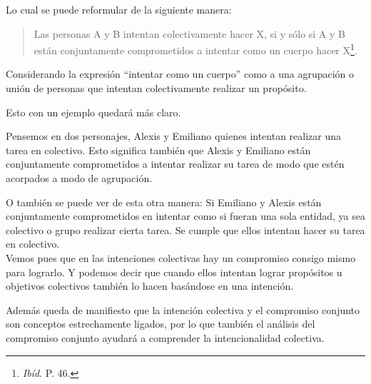 \documentclass[oneside]{book}
\begin{document}
Lo cual se puede reformular de la siguiente manera:

\begin{quote}
Las personas A y B intentan colectivamente hacer X, si y sólo si A y B están conjuntamente comprometidos a intentar como un cuerpo hacer X\footnote{\textit{Ibíd}. P. 46.}.
\end{quote}

Considerando la expresión “intentar como un cuerpo” como a una agrupación o unión de personas que intentan colectivamente realizar un propósito.

Esto con un ejemplo quedará más claro.

Pensemos en dos personajes, Alexis y Emiliano quienes intentan realizar una tarea en colectivo. Esto significa también que Alexis y Emiliano están conjuntamente comprometidos a intentar realizar su tarea de modo que estén acorpados a modo de agrupación.

O también se puede ver de esta otra manera: Si Emiliano y Alexis están conjuntamente comprometidos en intentar como si fueran una sola entidad, ya sea colectivo o grupo realizar cierta tarea. Se cumple que ellos intentan hacer su tarea en colectivo.
\\

Vemos pues que en las intenciones colectivas hay un compromiso consigo mismo para lograrlo. Y podemos decir que cuando ellos intentan lograr propósitos u objetivos colectivos también lo hacen basándose en una intención. 



Además queda de manifiesto que la intención colectiva y el compromiso conjunto son conceptos estrechamente ligados, por lo que también el análisis del compromiso conjunto ayudará a comprender la intencionalidad colectiva.

\end{document}
